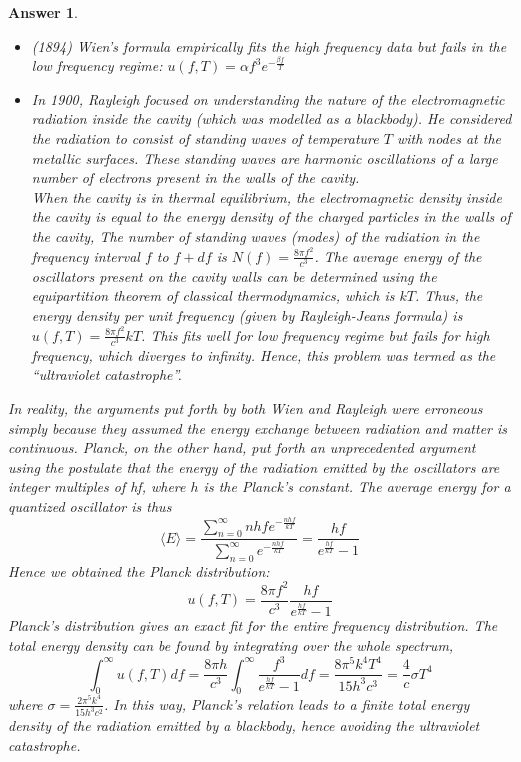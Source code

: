 \documentclass[a4paper]{article}
\newtheorem{ans}{Answer}[subsection]
\theoremstyle{new}
\begin{document}
\begin{ans}
\begin{itemize}
\item (1894) Wien's formula empirically fits the high frequency data but fails in the low frequency regime: $u(f,T)=\alpha f^3e^{-\frac{\beta f}{T}}$
\item In 1900, Rayleigh focused on understanding the nature of the electromagnetic radiation inside the cavity (which was modelled as a blackbody). He considered the radiation to consist of standing waves of temperature $T$ with nodes at the metallic surfaces. These standing waves are harmonic oscillations of a large number of electrons present in the walls of the cavity.\\[5pt]
When the cavity is in thermal equilibrium, the electromagnetic density inside the cavity is equal to the energy density of the charged particles in the walls of the cavity, The number of standing waves (modes) of the radiation in the frequency interval $f$ to $f+df$ is $N(f)=\frac{8\pi f^2}{c^3}$. The average energy of the oscillators present on the cavity walls can be determined using the equipartition theorem of classical thermodynamics, which is $kT$. Thus, the energy density per unit frequency (given by Rayleigh-Jeans formula) is $u(f,T)=\frac{8\pi f^2}{c^3}kT$. 
This fits well for low frequency regime but fails for high frequency, which diverges to infinity. Hence, this problem was termed as the ``ultraviolet catastrophe''.
\end{itemize}
In reality, the arguments put forth by both Wien and Rayleigh were erroneous simply because they assumed the energy exchange between radiation and matter is continuous. Planck, on the other hand, put forth an unprecedented argument using the postulate that the energy of the radiation emitted by the oscillators are integer multiples of hf, where $h$ is the Planck's constant.
The average energy for a quantized oscillator is thus
$$
\big \langle E \big \rangle = \frac{\sum_{n=0}^{\infty} nhfe^{-\frac{nhf}{kT}}}{\sum_{n=0}^{\infty}e^{-\frac{nhf}{kT}}}=\frac{hf}{e^{\frac{hf}{kT}}-1}$$
Hence we obtained the Planck distribution:
$$u(f,T)=\frac{8\pi f^2}{c^3}\frac{hf}{e^{\frac{hf}{kT}}-1}$$
Planck's distribution gives an exact fit for the entire frequency distribution. The total energy density can be found by integrating over the whole spectrum,
$$
\int_{0}^{\infty}u(f,T)df=\frac{8\pi h}{c^3}\int_{0}^{\infty}\frac{f^3}{e^{\frac{hf}{kT}}-1}df=\frac{8\pi^5 k^4T^4}{15h^3c^3}=\frac{4}{c}\sigma T^4$$
where $\sigma = \frac{2\pi^5 k^4}{15h^3c^2}$. In this way, Planck's relation leads to a finite total energy density of the radiation emitted by a blackbody, hence avoiding the ultraviolet catastrophe.

\end{ans}
\end{document}
